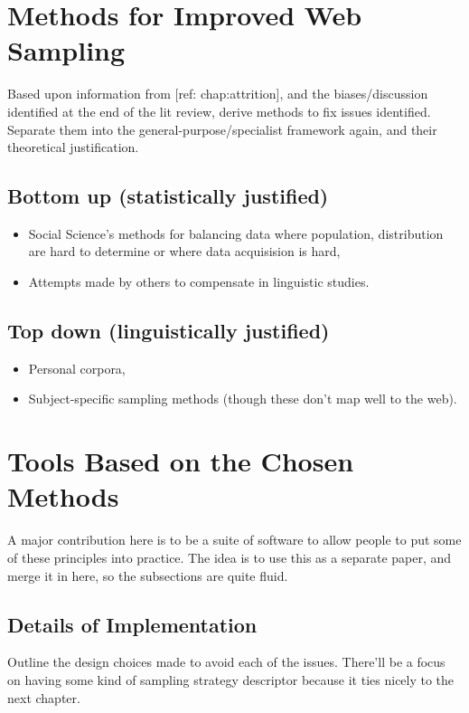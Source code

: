 
\section{Methods for Improved Web Sampling}
Based upon information from [ref: chap:attrition], and the biases/discussion identified at the end of the lit review, derive methods to fix issues identified.  Separate them into the general-purpose/specialist framework again, and their theoretical justification.

\subsection{Bottom up (statistically justified)}
\begin{itemize}
	\item Social Science's methods for balancing data where population, distribution are hard to determine or where data acquisision is hard,
	\item Attempts made by others to compensate in linguistic studies.
\end{itemize}

\subsection{Top down (linguistically justified)}
\begin{itemize}
	\item Personal corpora,
	\item Subject-specific sampling methods (though these don't map well to the web).
\end{itemize}



\section{Tools Based on the Chosen Methods}
A major contribution here is to be a suite of software to allow people to put some of these principles into practice.  The idea is to use this as a separate paper, and merge it in here, so the subsections are quite fluid.

\subsection{Details of Implementation}
Outline the design choices made to avoid each of the issues.  There'll be a focus on having some kind of sampling strategy descriptor because it ties nicely to the next chapter.

